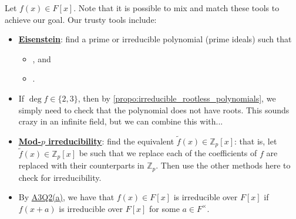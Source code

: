 \documentclass[notoc,notitlepage,nobib]{tufte-book}
\begin{document}
Let $f(x) \in F[x]$. Note that it is possible to mix and match these tools to
achieve our goal. Our trusty tools include:
\begin{itemize}
  \item \textbf{\hyperref[propo:eisenstein_s_criterion]{Eisenstein}}: find a
    prime or irreducible polynomial (prime ideals) such that
    \begin{itemize}
      \item {}, and
      \item {}.
    \end{itemize}

  \item If $\deg f \in \{ 2, 3 \}$, then by
    \cref{propo:irreducible_rootless_polynomials}, we simply need to check that
    the polynomial does not have roots. This sounds crazy in an infinite field,
    but we can combine this with...

  \item \textbf{\hyperref[propo:mod_p_irreducibility_test]{Mod-$p$
    irreducibility}}: find the equivalent $\tilde{f}(x) \in \mathbb{Z}_p[x]$:
    that is, let $\tilde{f}(x) \in \mathbb{Z}_p[x]$ be such that we replace each
    of the coefficients of $f$ are replaced with their counterparts in
    $\mathbb{Z}_p$. Then use the other methods here to check for irreducibility.

  \item By \hyperref[item:a3q2a]{A3Q2(a)}, we have that $f(x) \in F[x]$ is
    irreducible over $F[x]$ if $f(x + a)$ is irreducible over $F[x]$ for some $a
    \in F^\times$.
\end{itemize}
\end{document}
